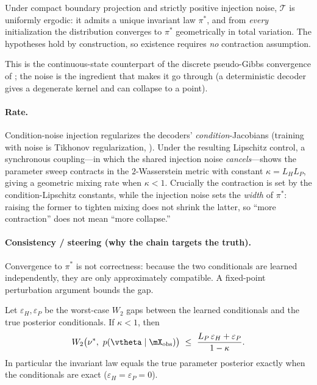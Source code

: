 \begin{theorem}
\label{thm:existence}
Under compact boundary projection and strictly positive injection noise, $\mathcal{T}$ is uniformly
ergodic: it admits a unique invariant law $\pi^\ast$, and from \emph{every} initialization the
distribution converges to $\pi^\ast$ geometrically in total variation. The hypotheses hold by
construction, so existence requires \emph{no} contraction assumption.
\end{theorem}

\noindent This is the continuous-state counterpart of the discrete pseudo-Gibbs convergence of
\citet{heckerman2000dependency}; the noise is the ingredient that makes it go through (a
deterministic decoder gives a degenerate kernel and can collapse to a point).

\paragraph{Rate.}
Condition-noise injection regularizes the decoders' \emph{condition}-Jacobians (training with noise
is Tikhonov regularization, \citealp{bishop1995training}). Under the resulting Lipschitz control, a
synchronous coupling---in which the shared injection noise \emph{cancels}---shows the parameter sweep
contracts in the $2$-Wasserstein metric with constant $\kappa = L_H L_P$, giving a geometric mixing
rate when $\kappa<1$. Crucially the contraction is set by the condition-Lipschitz constants, while
the injection noise sets the \emph{width} of $\pi^\ast$: raising the former to tighten mixing does
not shrink the latter, so ``more contraction'' does not mean ``more collapse.''

\paragraph{Consistency / steering (why the chain targets the truth).}
Convergence to $\pi^\ast$ is not correctness: because the two conditionals are learned independently,
they are only approximately compatible. A fixed-point perturbation argument bounds the gap.

\begin{theorem}
\label{thm:steering}
Let $\varepsilon_H, \varepsilon_P$ be the worst-case $W_2$ gaps between the learned conditionals and
the true posterior conditionals. If $\kappa<1$, then
\begin{equation}
\label{eqn:steering}
    W_2\big(\nu^\ast,\ p(\vtheta \mid \xobs)\big)\ \le\ \frac{L_P\,\varepsilon_H + \varepsilon_P}{1-\kappa}.
\end{equation}
In particular the invariant law equals the true parameter posterior exactly when the conditionals
are exact ($\varepsilon_H = \varepsilon_P = 0$).
\end{theorem}

